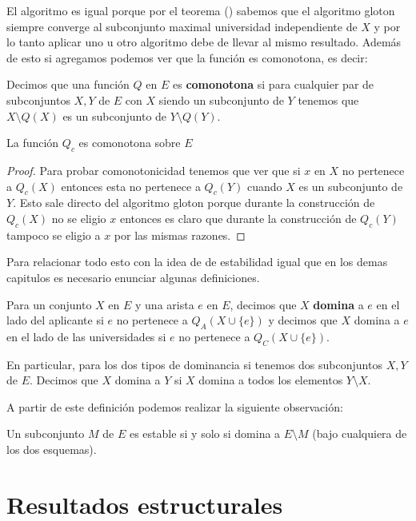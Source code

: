 El algoritmo es igual porque por el teorema () sabemos que el algoritmo gloton siempre converge al subconjunto maximal universidad independiente de $X$ y por lo tanto aplicar uno u otro algoritmo debe de llevar al mismo resultado. Además de esto si agregamos podemos ver que la función es comonotona, es decir:

\begin{dfn}
Decimos que una función $Q$ en $E$ es \textbf{comonotona} si para cualquier par de subconjuntos $X,Y$ de $E$ con $X$ siendo un subconjunto de $Y$ tenemos que $X\setminus Q(X)$ es un subconjunto de $Y\setminus Q(Y)$.
\end{dfn}

\begin{cor}
La función $Q_c$ es comonotona sobre $E$
\end{cor}

\begin{proof}
Para probar comonotonicidad tenemos que ver que si $x$ en $X$ no pertenece a $Q_c(X)$ entonces esta no pertenece a $Q_c(Y)$ cuando $X$ es un subconjunto de $Y$. Esto sale directo del algoritmo gloton porque durante la construcción de $Q_c(X)$ no se eligio $x$ entonces es claro que durante la construcción de $Q_c(Y)$ tampoco se eligio a $x$ por las mismas razones. 
\end{proof}

Para relacionar todo esto con la idea de de estabilidad igual que en los demas capitulos es necesario enunciar algunas definiciones.

\begin{dfn}
Para un conjunto $X$ en $E$ y una arista $e$ en $E$, decimos que $X$ \textbf{domina} a $e$ en el lado del aplicante si $e$ no pertenece a $Q_A(X \cup \{e\})$ y decimos que $X$ domina a $e$ en el lado de las universidades si $e$ no pertenece a $Q_C(X \cup \{e\})$.

En particular, para los dos tipos de dominancia si tenemos dos subconjuntos $X,Y$ de $E$. Decimos que $X$ domina a $Y$ si $X$ domina a todos los elementos $Y \setminus X$.
\end{dfn}

A partir de este definición podemos realizar la siguiente observación:

\begin{obs}
Un subconjunto $M$ de $E$ es estable si y solo si domina a $E\setminus M$ (bajo cualquiera de los dos esquemas).
\end{obs}

\section{Resultados estructurales}

